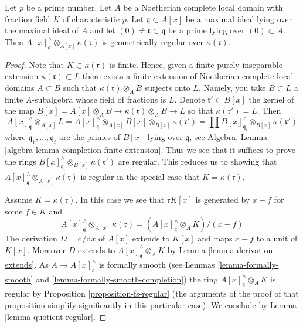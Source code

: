 \begin{lemma}
\label{lemma-another-helper-G-ring}
Let $p$ be a prime number. Let $A$ be a Noetherian complete local domain
with fraction field $K$ of characteristic $p$. Let $\mathfrak q \subset A[x]$
be a maximal ideal lying over the maximal ideal of $A$ and let
$(0) \not = \mathfrak r \subset \mathfrak q$ be a prime lying over
$(0) \subset A$. Then
$A[x]_\mathfrak q^\wedge \otimes_{A[x]} \kappa(\mathfrak r)$ is geometrically
regular over $\kappa(\mathfrak r)$.
\end{lemma}

\begin{proof}
Note that $K \subset \kappa(\mathfrak r)$ is finite.
Hence, given a finite purely
inseparable extension $\kappa(\mathfrak r) \subset L$ there exists a finite
extension of Noetherian complete local domains $A \subset B$ such that
$\kappa(\mathfrak r) \otimes_A B$ surjects onto $L$.
Namely, you take $B \subset L$
a finite $A$-subalgebra whose field of fractions is $L$. Denote
$\mathfrak r' \subset B[x]$ the kernel of the map
$B[x] = A[x] \otimes_A B \to \kappa(\mathfrak r) \otimes_A B \to L$
so that $\kappa(\mathfrak r') = L$. Then
$$
A[x]_\mathfrak q^\wedge \otimes_{A[x]} L =
A[x]_\mathfrak q^\wedge \otimes_{A[x]} B[x]
\otimes_{B[x]} \kappa(\mathfrak r') =
\prod B[x]_{\mathfrak q_i}^\wedge \otimes_{B[x]} \kappa(\mathfrak r')
$$
where $\mathfrak q_1, \ldots, \mathfrak q_t$ are the primes of $B[x]$
lying over $\mathfrak q$, see
Algebra, Lemma \ref{algebra-lemma-completion-finite-extension}.
Thus we see that it suffices to prove the rings
$B[x]_{\mathfrak q_i}^\wedge \otimes_{B[x]} \kappa(\mathfrak r')$
are regular. This reduces us to showing that
$A[x]_\mathfrak q^\wedge \otimes_{A[x]} \kappa(\mathfrak r)$
is regular in the special case that $K = \kappa(\mathfrak r)$.

\medskip\noindent
Assume $K = \kappa(\mathfrak r)$. In this case we see that
$\mathfrak r K[x]$ is generated by $x - f$ for some $f \in K$
and
$$
A[x]_\mathfrak q^\wedge \otimes_{A[x]} \kappa(\mathfrak r)
=
(A[x]_\mathfrak q^\wedge \otimes_A K)/(x - f)
$$
The derivation $D = \text{d}/\text{d}x$ of $A[x]$ extends to $K[x]$ and
maps $x - f$ to a unit of $K[x]$. Moreover $D$ extends to
$A[x]_\mathfrak q^\wedge \otimes_A K$ by Lemma \ref{lemma-derivation-extends}.
As $A \to A[x]_\mathfrak q^\wedge$ is formally smooth (see
Lemmas \ref{lemma-formally-smooth} and
\ref{lemma-formally-smooth-completion})
the ring $A[x]_\mathfrak q^\wedge \otimes_A K$ is regular by
Proposition \ref{proposition-fs-regular} (the arguments of the
proof of that proposition simplify significantly in this particular case).
We conclude by Lemma \ref{lemma-quotient-regular}.
\end{proof}

